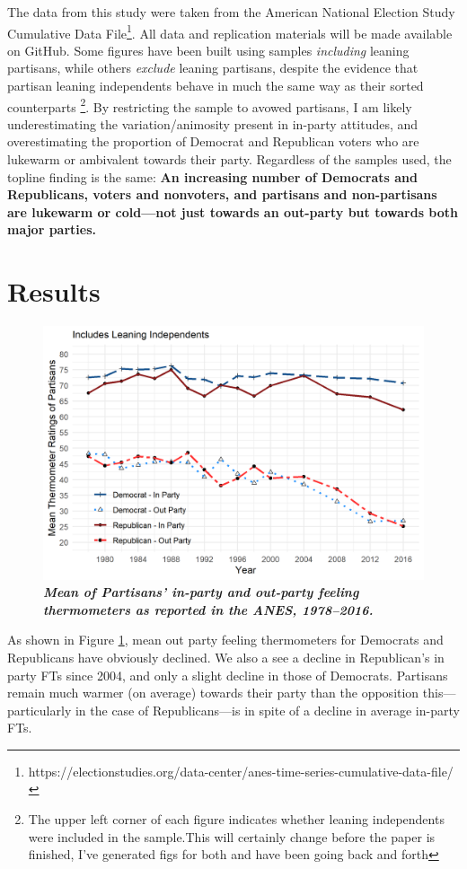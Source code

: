 \documentclass[12pt]{paper}
\begin{document}
The data from this study were taken from the American National Election Study Cumulative Data File\footnote{https://electionstudies.org/data-center/anes-time-series-cumulative-data-file/}. All data and replication materials will be made available on GitHub. Some figures have been built using samples \textit{including} leaning partisans, while others \textit{exclude} leaning partisans, despite the evidence that partisan leaning independents behave in much the same way as their sorted counterparts \citep{klar2016independent}\footnote{The upper left corner of each figure indicates whether leaning independents were included in the sample.This will certainly change before the paper is finished, I've generated figs for both and have been going back and forth}. By restricting the sample to avowed partisans, I am likely underestimating the variation/animosity present in in-party attitudes, and overestimating the proportion of Democrat and Republican voters who are lukewarm or ambivalent towards their party. Regardless of the samples used, the topline finding is the same: \textbf{An increasing number of Democrats and Republicans, voters and nonvoters, and partisans and non-partisans are lukewarm or cold---not just towards an out-party but towards both major parties.}


\section{Results}

\begin{figure}[H]
\centering
\includegraphics[width=.8\textwidth]{cdf-mean-ns.png}
\caption{\label{fig:cdf-mean} \textit{\textbf{Mean of Partisans' in-party and out-party feeling thermometers as reported in the ANES, 1978--2016.}%
}}
\end{figure}
As shown in Figure \ref{fig:cdf-mean}, mean out party feeling thermometers for Democrats and Republicans have obviously declined. We also a see a decline in Republican's in party FTs since 2004, and only a slight decline in those of Democrats. Partisans remain much warmer (on average) towards their party than the opposition this---particularly in the case of Republicans---is in spite of a decline in average in-party FTs.
\end{document}
